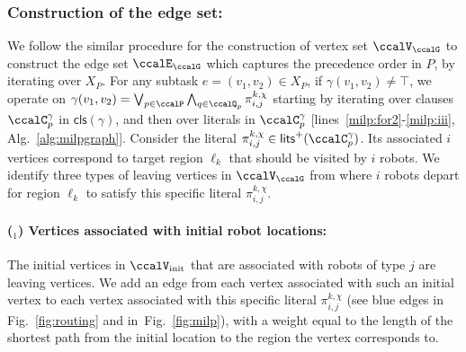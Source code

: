 \documentclass[Afour,sageh,times]{sagej}
\newcounter{mycounter}
\newcommand{\clause}[1]{\mathsf{cls}(#1)}
\renewcommand{\ap}[3]{\mathcal{\pi}_{{#1},{#2}}^{#3}}
\begin{document}
\subsubsection{Construction of  the edge set:}\label{sec:edge_set} We follow the similar procedure for the construction of vertex set $\ccalV_\ccalG$ to construct the edge set $\ccalE_\ccalG$ which captures the precedence order in ${P}$, by iterating over $X_P$. For any subtask $e = (v_1, v_2) \in X_{P}$, if $\gamma(v_1, v_2) \not=\top$, we operate on $\gamma(v_1, v_2) =  \bigvee_{p\in \ccalP} \bigwedge_{q \in \ccalQ_{p}} \ap{i}{j}{k,\chi}$ starting by iterating over clauses $\ccalC_p^{\gamma}$ in $\clause{\gamma}$, and then over literals in $\ccalC_p^\gamma$ [lines~\ref{milp:for2}-\ref{milp:iii}, Alg.~\ref{alg:milpgraph}]. Consider the literal $\ap{i}{j}{k,\chi} \in \mathsf{lits}^+(\ccalC_p^{\gamma})$. Its associated $i$ vertices correspond to target region $\ell_k$ that should be visited by $i$ robots. We identify three types of leaving vertices in $\ccalV_\ccalG$ from where $i$ robots depart for region $\ell_k$ to satisfy this specific literal $\ap{i}{j}{k,\chi}$.
\paragraph{($_1$) Vertices associated with initial robot locations:}\label{sec:a} The initial vertices in $\ccalV_{\text{init}}$ that are associated with  robots of type $j$ are leaving vertices. We add an edge from each vertex associated with such an initial vertex to each vertex associated with this specific literal $\ap{i}{j}{k,\chi}$ (see blue edges in Fig.~\ref{fig:routing} and in~Fig.~\ref{fig:milp}), with a weight equal to the length of the shortest path from the initial location to the region the vertex corresponds to.
\end{document}
